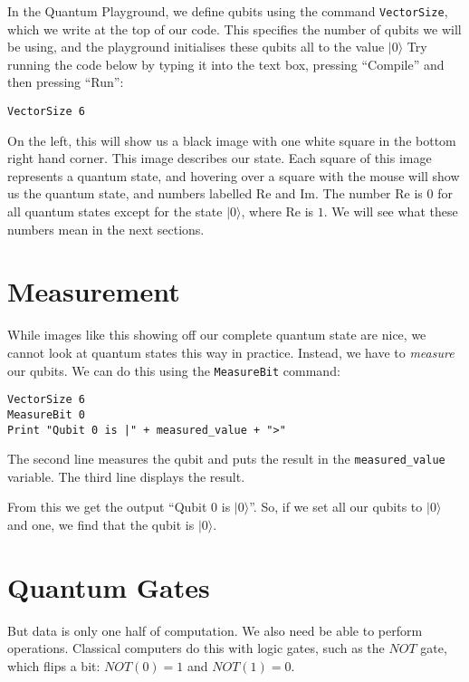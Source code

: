 \documentclass[twocolumn]{article}
\begin{document}
In the Quantum Playground, we define qubits using the command \texttt{VectorSize}, which we write at the top of our code. This specifies the number of qubits we will be using, and the playground initialises these qubits all to the value $|0\rangle$ Try running the code below by typing it into the text box, pressing ``Compile'' and then pressing ``Run'':

\begin{lstlisting}
VectorSize 6
\end{lstlisting}

On the left, this will show us a black image with one white square in the bottom right hand corner. This image describes our state. Each square of this image represents a quantum state, and hovering over a square with the mouse will show us the quantum state, and numbers labelled Re and Im. The number Re is $0$ for all quantum states except for the state $|0\rangle$, where Re is $1$. We will see what these numbers mean in the next sections.

\section{Measurement}

While images like this showing off our complete quantum state are nice, we cannot look at quantum states this way in practice. Instead, we have to {\em measure} our qubits. We can do this using the \texttt{MeasureBit} command:

\begin{lstlisting}
VectorSize 6
MeasureBit 0
Print "Qubit 0 is |" + measured_value + ">"
\end{lstlisting}

The second line measures the qubit and puts the result in the \texttt{measured\_value} variable. The third line displays the result.

From this we get the output ``Qubit $0$ is $|0\rangle$''. So, if we set all our qubits to $|0\rangle$ and one, we find that the qubit is  $|0\rangle$.

\section{Quantum Gates}

But data is only one half of computation. We also need be able to perform operations. Classical computers do this with logic gates, such as the $NOT$ gate, which flips a bit: $NOT(0) = 1$ and $NOT(1) = 0$.
\end{document}
